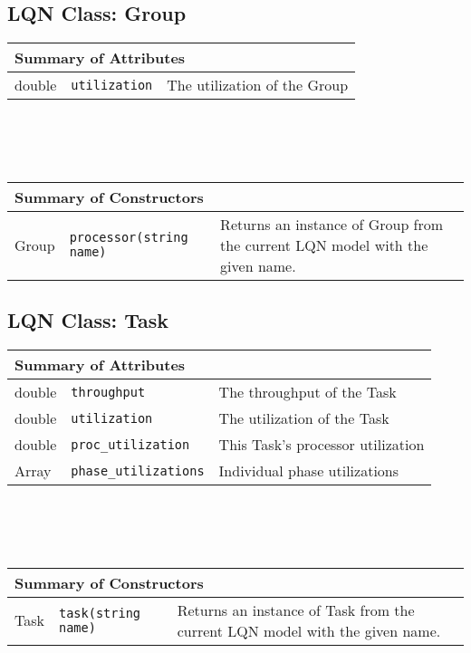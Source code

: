 \subsection{LQN Class: Group}
\begin{tabular}{|p{1.0in}|p{2.3in}||p{2.8in}|}
  \hline
  \multicolumn{3}{|l|}{\textbf{Summary of Attributes}}\\
  \hline
  double & {\tt utilization} & The utilization of the Group\\
  \hline
\end{tabular}
\\\\\ \\
\begin{tabular}{|p{1.0in}|p{2.3in}||p{2.8in}|}
  \hline
  \multicolumn{3}{|l|}{\textbf{Summary of Constructors}}\\
  \hline
  Group & {\tt processor(string name)} & Returns an instance of Group from the current LQN model with the given name.\\
  \hline
\end{tabular}

\subsection{LQN Class: Task}
\begin{tabular}{|p{1.0in}|p{2.3in}||p{2.8in}|}
  \hline
  \multicolumn{3}{|l|}{\textbf{Summary of Attributes}}\\
  \hline
  double & {\tt throughput} & The throughput of the Task\\
  double & {\tt utilization} & The utilization of the Task\\
  double & {\tt proc\_utilization} & This Task's processor utilization\\
  Array & {\tt phase\_utilizations} & Individual phase utilizations\\
  \hline
\end{tabular}
\\\\\ \\
\begin{tabular}{|p{1.0in}|p{2.3in}||p{2.8in}|}
  \hline
  \multicolumn{3}{|l|}{\textbf{Summary of Constructors}}\\
  \hline
  Task & {\tt task(string name)} & Returns an instance of Task from the current LQN model with the given name.\\
  \hline
\end{tabular}

